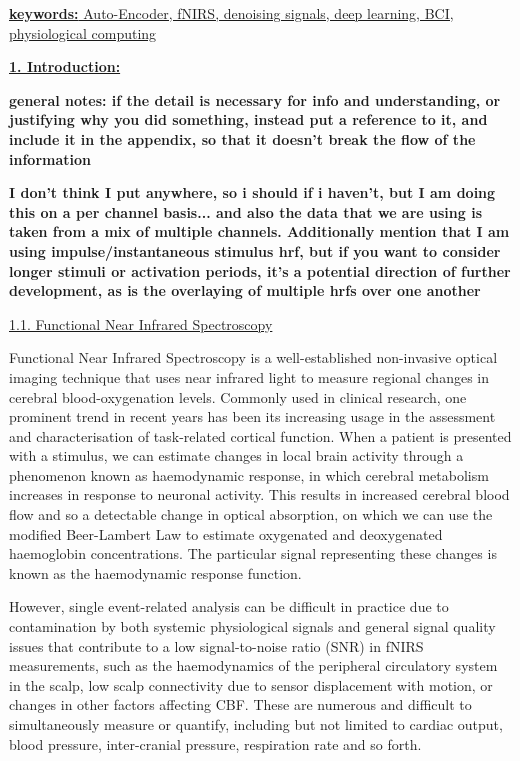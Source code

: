 \documentclass[9pt]{article}
\begin{document}
\ul{\textbf{keywords:} Auto-Encoder, fNIRS, denoising signals, deep learning, BCI, physiological computing}

\underline{\textbf{1. Introduction:}} 

\textbf{general notes: if the detail is necessary for info and understanding, or justifying why you did something, instead put a reference to it, and include it in the appendix, so that it doesn't break the flow of the information}

\textbf{I don't think I put anywhere, so i should if i haven't, but I am doing this on a per channel basis... and also the data that we are using is taken from a mix of multiple channels. Additionally mention that I am using impulse/instantaneous stimulus hrf, but if you want to consider longer stimuli or activation periods, it's a potential direction of further development, as is the overlaying of multiple hrfs over one another}

\ul{1.1. Functional Near Infrared Spectroscopy}


Functional Near Infrared Spectroscopy is a well-established non-invasive optical imaging technique that uses near infrared light to measure regional changes in cerebral blood-oxygenation levels. Commonly used in clinical research, one prominent trend in recent years has been its increasing usage in the assessment and characterisation of task-related cortical function. When a patient is presented with a stimulus, we can estimate changes in local brain activity through a phenomenon known as haemodynamic response, in which cerebral metabolism increases in response to neuronal activity. This results in increased cerebral blood flow and so a detectable change in optical absorption, on which we can use the modified Beer-Lambert Law to estimate oxygenated and deoxygenated haemoglobin concentrations. The particular signal representing these changes is known as the haemodynamic response function.

However, single event-related analysis can be difficult in practice due to contamination by both systemic physiological signals and general signal quality issues that contribute to a low signal-to-noise ratio (SNR) in fNIRS measurements, such as the haemodynamics of the peripheral circulatory system in the scalp, low scalp connectivity due to sensor displacement with motion, or changes in other factors affecting CBF. These are numerous and difficult to simultaneously measure or quantify, including but not limited to cardiac output, blood pressure, inter-cranial pressure, respiration rate and so forth. 
\end{document}
